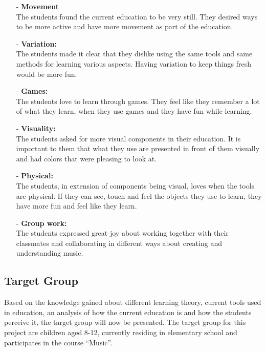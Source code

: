 \begin{itemize}
	\item[-] \textbf{Movement}\\
	The students found the current education to be very still. They desired ways to be more active and have more movement as part of the education.\\
	\item[-] \textbf{Variation:}\\
	The students made it clear that they dislike using the same tools and same methods for learning various aspects. Having variation to keep things fresh would be more fun.\\
	\item[-] \textbf{Games:}\\
	The students love to learn through games. They feel like they remember a lot of what they learn, when they use games and they have fun while learning. \\
	\item[-] \textbf{Visuality:}\\
	The students asked for more visual components in their education. It is important to them that what they use are presented in front of them visually and had colors that were pleasing to look at.\\
	\item[-] \textbf{Physical:}\\
	The students, in extension of components being visual, loves when the tools are physical. If they can see, touch and feel the objects they use to learn, they have more fun and feel like they learn.\\
	\item[-] \textbf{Group work:}\\
	The students expressed great joy about working together with their classmates and collaborating in different ways about creating and understanding music.\\
	
\end{itemize}



\subsection{Target Group} \label{sec:targetgroup} 
Based on the knowledge gained about different learning theory, current tools used in education, an analysis of how the current education is and how the students perceive it, the target group will now be presented.
The target group for this project are children aged 8-12, currently residing in elementary school and participates in the course “Music”.\\

